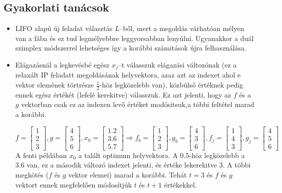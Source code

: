 \subsection{Gyakorlati tanácsok}
\begin{itemize}
	\item LIFO alapú új feladat választás $L$--ből, mert a megoldás várhatóan
	      mélyen van a fába és ez tud legmélyebbre leggyorsabban lenyúlni. Ugyanakkor a
	      duál szimplex módszerrel lehetséges így a korábbi számitások újra felhasználása.
	\item Elágazásnál a legkevésbé egész $x_j$--t válasszuk elágazási változónak
	      (ez a relaxált IP feladatt megoldásának helyvektora, azaz azt az indexet ahol
	      e vektor elemének törtrésze $\frac{1}{2}$-höz legközelebb van), közbülső
	      értéknek pedig ennek egész értékét (lefelé kerekitve) válasszuk. Ez azt
	      jelenti, hogy az $f$ és a $g$ vektorban csak ez az indexen levő értéket
	      modósitsuk,a többi feltétel marad a korábbi.

	      \[
		      f=\begin{bmatrix}
			      1 \\
			      2 \\
			      3
		      \end{bmatrix},
		      g = \begin{bmatrix}
			      4 \\
			      5 \\
			      6
		      \end{bmatrix},
		      x_0 = \begin{bmatrix}
			      1.2 \\
			      3.6 \\
			      5.7
		      \end{bmatrix}
		      \Rightarrow
		      f_b=\begin{bmatrix}
			      1 \\
			      2 \\
			      3
		      \end{bmatrix},
		      g_b = \begin{bmatrix}
			      4 \\
			      3 \\
			      6
		      \end{bmatrix},
		      f_j=\begin{bmatrix}
			      1 \\
			      4 \\
			      3
		      \end{bmatrix},
		      g_j = \begin{bmatrix}
			      4 \\
			      5 \\
			      6
		      \end{bmatrix}
	      \] A fenti példában $x_0$ a talált optimum helyvektora. A $0.5$-höz
	      legközelebb a $3.6$ van, ez a második változó indexet jelenti, és értéke lekerekitve $3$. A
	      többi megkötés ($f$ és $g$ vektor elemei) marad a korábbi. Tehát $t=3$ és $f$
	      és $g$ vektort ennek megfelelően módosítjúk $t$ és $t+1$ értékekkel.
\end{itemize}
